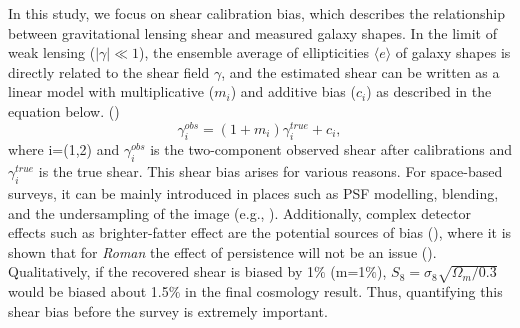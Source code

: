 \documentclass[fleqn,usenatbib]{mnras}
\begin{document}
In this study, we focus on shear calibration bias, which describes the relationship between gravitational lensing shear and measured galaxy shapes. In the limit of weak lensing ($\lvert\gamma\rvert\ll1$), the ensemble average of ellipticities $\langle e \rangle$ of galaxy shapes is directly related to the shear field $\gamma$, and the estimated shear can be written as a linear model with multiplicative ($m_{i}$) and additive bias ($c_{i}$) as described in the equation below. (\citealt{2006MNRAS.368.1323H, 2006MNRAS.366..101H, 2007MNRAS.376...13M}) 
\begin{equation}
    \gamma^{obs}_{i} = (1+m_{i})\gamma^{true}_{i} + c_{i}, 
    \label{eqn:linear}
\end{equation}
where i=(1,2) and $\gamma^{obs}_{i}$ is the two-component observed shear after calibrations and $\gamma^{true}_{i}$ is the true shear. This shear bias arises for various reasons. For space-based surveys, it can be mainly introduced in places such as PSF modelling, blending, and the undersampling of the image (e.g., \citealt{2018ARA&A..56..393M}). Additionally, complex detector effects such as brighter-fatter effect are the potential sources of bias (\citealt{2013MNRAS.429..661M}), where it is shown that for \emph{Roman} the effect of persistence will not be an issue (\citealt{2021arXiv210610273L}). Qualitatively, if the recovered shear is biased by 1$\%$ (m=1$\%$), $S_{8} = \sigma_{8} \sqrt{\Omega_{m}/0.3}$ would be biased about 1.5$\%$ in the final cosmology result. Thus, quantifying this shear bias before the survey is extremely important. \par
\end{document}
